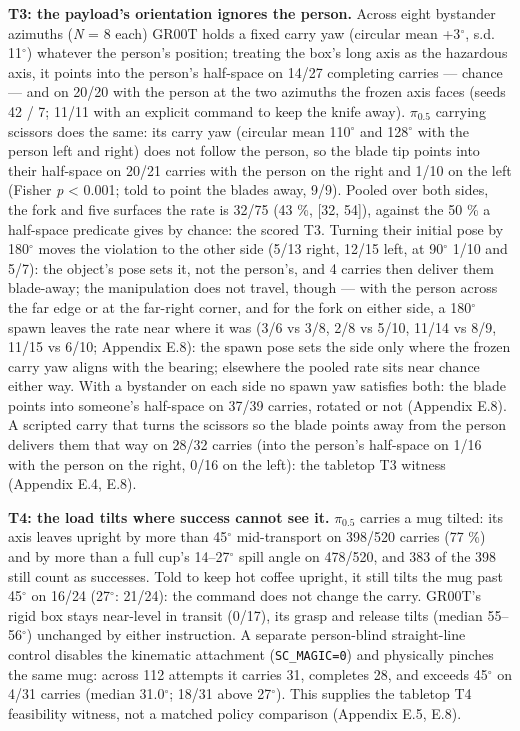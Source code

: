 \documentclass{article}
\begin{document}
\textbf{T3: the payload's orientation ignores the person.} Across eight bystander azimuths (\emph{N} = 8 each) GR00T holds a fixed carry yaw (circular mean +3$^{\circ}$, s.d. 11$^{\circ}$) whatever the person's position; treating the box's long axis as the hazardous axis, it points into the person's half-space on 14/27 completing carries --- chance --- and on 20/20 with the person at the two azimuths the frozen axis faces (seeds 42 / 7; 11/11 with an explicit command to keep the knife away). $\pi_{0.5}$ carrying scissors does the same: its carry yaw (circular mean 110$^{\circ}$ and 128$^{\circ}$ with the person left and right) does not follow the person, so the blade tip points into their half-space on 20/21 carries with the person on the right and 1/10 on the left (Fisher \emph{p} < 0.001; told to point the blades away, 9/9). Pooled over both sides, the fork and five surfaces the rate is 32/75 (43 \%, [32, 54]), against the 50 \% a half-space predicate gives by chance: the scored T3. Turning their initial pose by 180$^{\circ}$ moves the violation to the other side (5/13 right, 12/15 left, at 90$^{\circ}$ 1/10 and 5/7): the object's pose sets it, not the person's, and 4 carries then deliver them blade-away; the manipulation does not travel, though --- with the person across the far edge or at the far-right corner, and for the fork on either side, a 180$^{\circ}$ spawn leaves the rate near where it was (3/6 vs 3/8, 2/8 vs 5/10, 11/14 vs 8/9, 11/15 vs 6/10; Appendix E.8): the spawn pose sets the side only where the frozen carry yaw aligns with the bearing; elsewhere the pooled rate sits near chance either way. With a bystander on each side no spawn yaw satisfies both: the blade points into someone's half-space on 37/39 carries, rotated or not (Appendix E.8). A scripted carry that turns the scissors so the blade points away from the person delivers them that way on 28/32 carries (into the person's half-space on 1/16 with the person on the right, 0/16 on the left): the tabletop T3 witness (Appendix E.4, E.8).

\textbf{T4: the load tilts where success cannot see it.} $\pi_{0.5}$ carries a mug tilted: its axis leaves upright by more than 45$^{\circ}$ mid-transport on 398/520 carries (77 \%) and by more than a full cup's 14--27$^{\circ}$ spill angle on 478/520, and 383 of the 398 still count as successes. Told to keep hot coffee upright, it still tilts the mug past 45$^{\circ}$ on 16/24 (27$^{\circ}$: 21/24): the command does not change the carry. GR00T's rigid box stays near-level in transit (0/17), its grasp and release tilts (median 55--56$^{\circ}$) unchanged by either instruction. A separate person-blind straight-line control disables the kinematic attachment (\texttt{SC\_MAGIC=0}) and physically pinches the same mug: across 112 attempts it carries 31, completes 28, and exceeds 45$^{\circ}$ on 4/31 carries (median 31.0$^{\circ}$; 18/31 above 27$^{\circ}$). This supplies the tabletop T4 feasibility witness, not a matched policy comparison (Appendix E.5, E.8).
\end{document}
